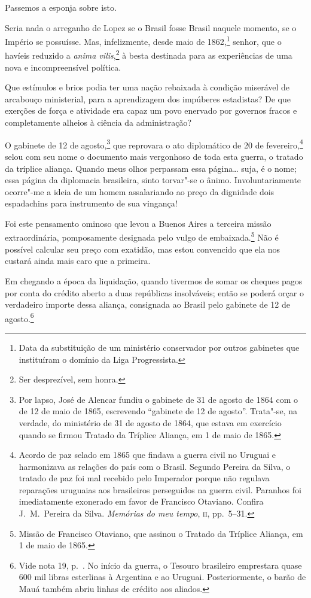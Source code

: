 \begin{linenumbers}
 Passemos a esponja sobre isto.

 Seria nada o arreganho de Lopez se o Brasil fosse Brasil naquele
momento, se o Império se possuísse. Mas, infelizmente, desde maio de
1862,\footnote{ Data da substituição de um ministério conservador por outros gabinetes que
instituíram o domínio da Liga Progressista.}
 senhor, que o havíeis reduzido a \textit{anima vilis},\footnote{ Ser
desprezível, sem honra.} à besta destinada para as experiências 
de uma nova e incompreensível política.

 Que estímulos e brios podia ter uma nação rebaixada à condição
miserável de arcabouço ministerial, para a aprendizagem dos impúberes
estadistas? De que exerções de força e atividade era capaz um povo
enervado por governos fracos e completamente alheios à ciência da administração?

 O gabinete de 12 de agosto,\footnote{ \label{gale}Por lapso, José de Alencar fundiu o gabinete 
de 31 de agosto de 1864 com o
de 12 de maio de 1865, escrevendo ``gabinete de 12 de agosto''.
Trata"-se, na verdade, do ministério de 31 de agosto de 1864, que
estava em exercício quando se firmou Tratado da Tríplice Aliança, em 1
de maio de 1865.} que reprovara o ato diplomático de 20 de
fevereiro,\footnote{ Acordo de paz selado em 1865 que findava a guerra civil no Uruguai e
harmonizava as relações do país com o Brasil. Segundo Pereira da Silva,
o tratado de paz foi mal recebido pelo Imperador porque não regulava
reparações uruguaias aos brasileiros perseguidos na guerra civil.
Paranhos foi imediatamente exonerado em favor de Francisco Otaviano.
Confira J.~M.~Pereira da Silva. \textit{Memórias do meu tempo}, \textsc{ii}, pp.~5--31.}
 selou com seu nome o documento mais vergonhoso de toda esta guerra, o
tratado da tríplice aliança. Quando meus olhos perpassam essa página\ldots{}
suja, é o nome; essa página da diplomacia brasileira, sinto torvar"-se
o ânimo. Involuntariamente ocorre"-me a ideia de um homem assalariando
ao preço da dignidade dois espadachins para instrumento de sua vingança!

 Foi este pensamento ominoso que levou a Buenos Aires a terceira missão
extraordinária, pomposamente designada pelo vulgo de
embaixada.\footnote{ Missão de Francisco Otaviano, que assinou o Tratado da Tríplice
Aliança, em 1 de maio de 1865.}
 Não é possível calcular seu preço com exatidão, mas estou convencido
que ela nos custará ainda mais caro que a primeira.

 Em chegando a época da liquidação, quando tivermos de somar os cheques
pagos por conta do crédito aberto a duas repúblicas insolváveis; então
se poderá orçar o verdadeiro importe dessa aliança, consignada ao
Brasil pelo gabinete de 12 de
agosto.\footnote{ Vide nota 19, p.~\pageref{gale}. No início da guerra, o Tesouro brasileiro emprestara quase 600
mil libras esterlinas à Argentina e ao Uruguai. Posteriormente, o barão
de Mauá também abriu linhas de crédito aos aliados.}



\end{linenumbers}
